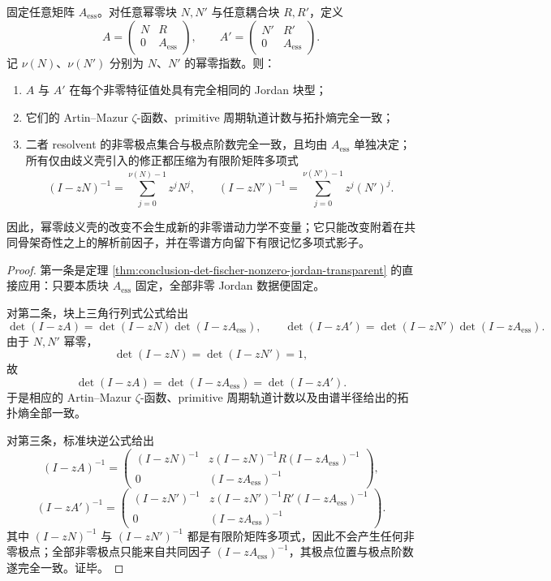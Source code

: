 \begin{theorem}\label{thm:conclusion-ambiguity-shell-zeta-entropy-isospectral-deformation}
固定任意矩阵 \(A_{\mathrm{ess}}\)。对任意幂零块 \(N,N'\) 与任意耦合块 \(R,R'\)，定义
\[
A=
\begin{pmatrix}
N & R\\
0 & A_{\mathrm{ess}}
\end{pmatrix},
\qquad
A'=
\begin{pmatrix}
N' & R'\\
0 & A_{\mathrm{ess}}
\end{pmatrix}.
\]
记 \(\nu(N)\)、\(\nu(N')\) 分别为 \(N\)、\(N'\) 的幂零指数。则：
\begin{enumerate}
  \item \(A\) 与 \(A'\) 在每个非零特征值处具有完全相同的 Jordan 块型；
  \item 它们的 Artin--Mazur \(\zeta\)-函数、primitive 周期轨道计数与拓扑熵完全一致；
  \item 二者 resolvent 的非零极点集合与极点阶数完全一致，且均由 \(A_{\mathrm{ess}}\) 单独决定；所有仅由歧义壳引入的修正都压缩为有限阶矩阵多项式
  \[
  (I-zN)^{-1}=\sum_{j=0}^{\nu(N)-1}z^jN^j,
  \qquad
  (I-zN')^{-1}=\sum_{j=0}^{\nu(N')-1}z^j(N')^j.
  \]
\end{enumerate}
因此，幂零歧义壳的改变不会生成新的非零谱动力学不变量；它只能改变附着在共同骨架奇性之上的解析前因子，并在零谱方向留下有限记忆多项式影子。
\end{theorem}
\begin{proof}
第一条是定理 \ref{thm:conclusion-det-fischer-nonzero-jordan-transparent} 的直接应用：只要本质块 \(A_{\mathrm{ess}}\) 固定，全部非零 Jordan 数据便固定。

对第二条，块上三角行列式公式给出
\[
\det(I-zA)=\det(I-zN)\det(I-zA_{\mathrm{ess}}),
\qquad
\det(I-zA')=\det(I-zN')\det(I-zA_{\mathrm{ess}}).
\]
由于 \(N,N'\) 幂零，
\[
\det(I-zN)=\det(I-zN')=1,
\]
故
\[
\det(I-zA)=\det(I-zA_{\mathrm{ess}})=\det(I-zA').
\]
于是相应的 Artin--Mazur \(\zeta\)-函数、primitive 周期轨道计数以及由谱半径给出的拓扑熵全部一致。

对第三条，标准块逆公式给出
\[
(I-zA)^{-1}
=
\begin{pmatrix}
(I-zN)^{-1} & z(I-zN)^{-1}R(I-zA_{\mathrm{ess}})^{-1}\\
0 & (I-zA_{\mathrm{ess}})^{-1}
\end{pmatrix},
\]
\[
(I-zA')^{-1}
=
\begin{pmatrix}
(I-zN')^{-1} & z(I-zN')^{-1}R'(I-zA_{\mathrm{ess}})^{-1}\\
0 & (I-zA_{\mathrm{ess}})^{-1}
\end{pmatrix}.
\]
其中 \((I-zN)^{-1}\) 与 \((I-zN')^{-1}\) 都是有限阶矩阵多项式，因此不会产生任何非零极点；全部非零极点只能来自共同因子 \((I-zA_{\mathrm{ess}})^{-1}\)，其极点位置与极点阶数遂完全一致。证毕。
\end{proof}


